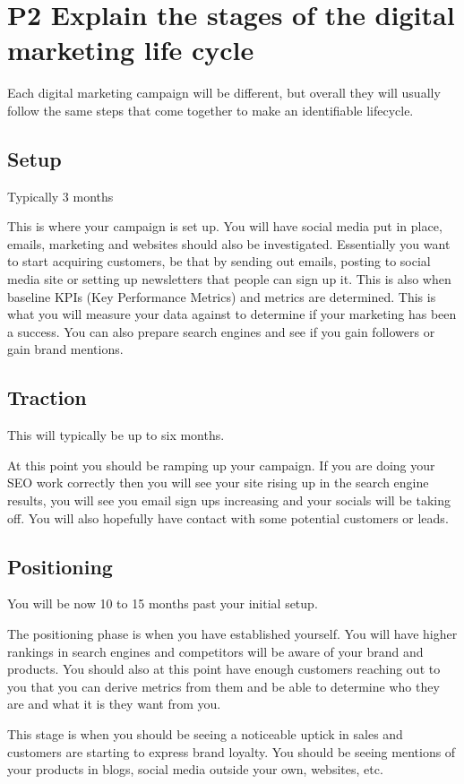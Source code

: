 \documentclass{article}
\begin{document}
\section{P2 Explain the stages of the digital marketing life cycle}

Each digital marketing campaign will be different, but overall they will usually follow the same steps that come together to make an identifiable lifecycle.

\subsection{Setup}
Typically 3 months

This is where your campaign is set up. 
You will have social media put in place, emails, marketing and websites should also be investigated.
Essentially you want to start acquiring customers, be that by sending out emails, posting to social media site or setting up newsletters that people can sign up it.
This is also when baseline KPIs (Key Performance Metrics) and metrics are determined. This is what you will measure your data against to determine if your marketing has been a success.
You can also prepare search engines and see if you gain followers or gain brand mentions.
\subsection{Traction}
This will typically be up to six months.

At this point you should be ramping up your campaign. If you are doing your SEO work correctly then you will see your site rising up in the search engine results, you will see you email sign ups increasing and your socials will be taking off.
You will also hopefully have contact with some potential customers or leads.

\subsection{Positioning}
You will be now 10 to 15 months past your initial setup.

The positioning phase is when you have established yourself. You will have higher rankings in search engines and competitors will be aware of your brand and products. 
You should also at this point have enough customers reaching out to you that you can derive metrics from them and be able to determine who they are and what it is they want from you. 

This stage is when you should be seeing a noticeable uptick in sales and customers are starting to express brand loyalty.
You should be seeing mentions of your products in blogs, social media outside your own, websites, etc.
\end{document}
